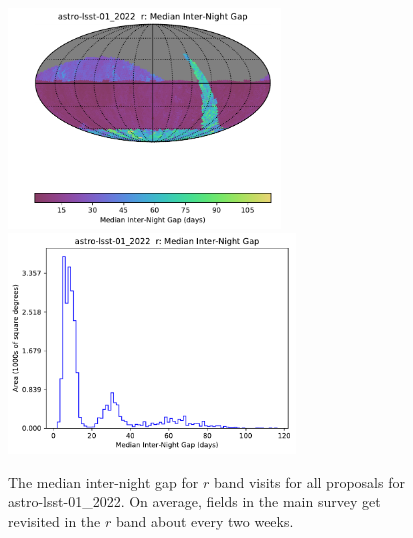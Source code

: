 \documentclass[DM,lsstdraft,authoryear,toc]{lsstdoc}
\begin{document}
\begin{figure}[htb]
\centering
\vskip -0.0in
\includegraphics[height=2.3in]{figures/astro-lsst-01_2022_Median_Inter-Night_Gap_r_HEAL_SkyMap.pdf}
\includegraphics[height=2.3in]{figures/astro-lsst-01_2022_Median_Inter-Night_Gap_r_HEAL_Histogram.pdf}
\vskip -0.1in
\caption{The median inter-night gap for $r$ band visits for all proposals for astro-lsst-01\_2022.
On average, fields in the main survey get revisited in the $r$ band about every two weeks.}
\label{fig:baseline_Gapr}
\end{figure}
\end{document}
